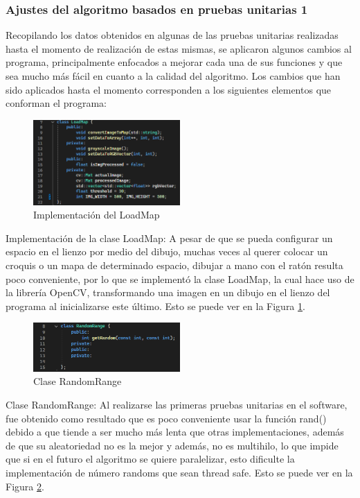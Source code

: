 \subsubsection{Ajustes del algoritmo basados en pruebas unitarias 1}
    Recopilando los datos obtenidos en algunas de las pruebas
        unitarias realizadas hasta el momento de realizaci\'on de estas
        mismas, se aplicaron algunos cambios al programa,
        principalmente enfocados a mejorar cada una de sus
        funciones y que sea mucho m\'as f\'acil en cuanto a la calidad
        del algoritmo.
        \vskip 0.5cm
    Los cambios que han sido aplicados hasta el momento
        corresponden a los siguientes elementos que conforman el
        programa:
        \vskip 0.5cm
    \begin{figure}[htbp]
        \centering
        \includegraphics[width=0.5\textwidth]{./images/Pruebas/simulador/image045.png}
        \caption{Implementaci\'on del LoadMap}
        \label{fig:Pruebaunitaria2}
    \end{figure}
    Implementaci\'on de la clase LoadMap: A pesar de que se
        pueda configurar un espacio en el lienzo por medio del
        dibujo, muchas veces al querer colocar un croquis o un mapa
        de determinado espacio, dibujar a mano con el rat\'on resulta
        poco conveniente, por lo que se implement\'o la clase
        LoadMap, la cual hace uso de la librer\'ia OpenCV,
        transformando una imagen en un dibujo en el lienzo del
        programa al inicializarse este \'ultimo. Esto se puede ver en
        la Figura \ref{fig:Pruebaunitaria2}.
        \vskip 0.5cm
    \begin{figure}[htbp]
        \centering
        \includegraphics[width=0.5\textwidth]{./images/Pruebas/simulador/image046.png}
        \caption{Clase RandomRange}
        \label{fig:Pruebaunitaria3}
    \end{figure}
    Clase RandomRange: Al realizarse las primeras pruebas
        unitarias en el software, fue obtenido como resultado que es
        poco conveniente usar la funci\'on rand() debido a que tiende
        a ser mucho m\'as lenta que otras implementaciones, adem\'as
        de que su aleatoriedad no es la mejor y adem\'as, no es
        multihilo, lo que impide que si en el futuro el algoritmo se
        quiere paralelizar, esto dificulte la implementaci\'on de n\'umero randoms que sean thread safe. Esto se puede ver en
        la Figura \ref{fig:Pruebaunitaria3}.
        \vskip 0.5cm
